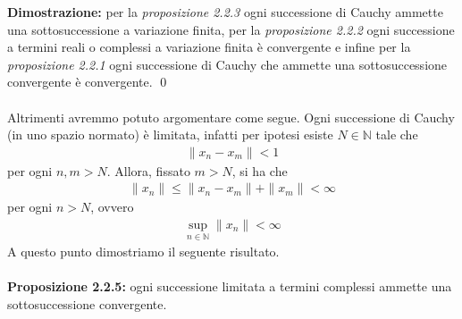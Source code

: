 \documentclass{article}
\numberwithin{equation}{subsection}
\begin{document}
\textbf{Dimostrazione:} per la \textit{proposizione 2.2.3} ogni successione di Cauchy ammette una sottosuccessione a variazione finita, per la \textit{proposizione 2.2.2} ogni successione a termini reali o complessi a variazione finita è convergente e infine per la \textit{proposizione 2.2.1} ogni successione di Cauchy che ammette una sottosuccessione convergente è convergente. \qed \\ \\
Altrimenti avremmo potuto argomentare come segue. Ogni successione di Cauchy (in uno spazio normato) è limitata, infatti per ipotesi esiste $N \in \mathbb{N}$ tale che
\begin{align*}
    \|x_n - x_m\| < 1 
\end{align*}
per ogni $n, m > N$. Allora, fissato $m > N$, si ha che
\begin{align*}
    \|x_n\| \leq \|x_n - x_m\| + \|x_m\| < \infty 
\end{align*}
per ogni $n > N$, ovvero
\begin{align*}
    \sup_{n \in \mathbb{N}}\|x_n\| < \infty 
\end{align*}
A questo punto dimostriamo il seguente risultato. \\ \\
\textbf{Proposizione 2.2.5:} ogni successione limitata a termini complessi ammette una sottosuccessione convergente. \\
\end{document}

